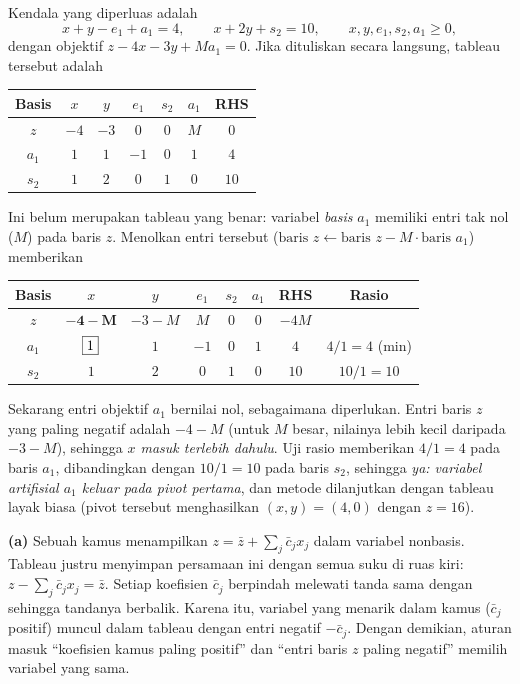 
Kendala yang diperluas adalah
\[
x + y - e_1 + a_1 = 4,
\qquad
x + 2y + s_2 = 10,
\qquad
x, y, e_1, s_2, a_1 \geq 0,
\]
dengan objektif $z - 4x - 3y + M a_1 = 0$. Jika dituliskan secara langsung,
tableau tersebut adalah
\begin{center}
\renewcommand{\arraystretch}{1.3}
\begin{tabular}{c|ccccc|c}
Basis & $x$ & $y$ & $e_1$ & $s_2$ & $a_1$ & RHS\\
\hline
$z$   & $-4$ & $-3$ & $0$ & $0$ & $M$ & $0$\\
\hline
$a_1$ & $1$ & $1$ & $-1$ & $0$ & $1$ & $4$\\
$s_2$ & $1$ & $2$ & $0$  & $1$ & $0$ & $10$\\
\end{tabular}
\end{center}
Ini belum merupakan tableau yang benar: variabel \emph{basis} $a_1$ memiliki
entri tak nol ($M$) pada baris $z$. Menolkan entri tersebut
($\text{baris }z \leftarrow \text{baris }z - M \cdot \text{baris }a_1$) memberikan
\begin{center}
\renewcommand{\arraystretch}{1.3}
\begin{tabular}{c|ccccc|c|c}
Basis & $x$ & $y$ & $e_1$ & $s_2$ & $a_1$ & RHS & Rasio\\
\hline
$z$   & $\mathbf{-4-M}$ & $-3-M$ & $M$ & $0$ & $0$ & $-4M$ & \\
\hline
$a_1$ & $\fbox{1}$ & $1$ & $-1$ & $0$ & $1$ & $4$ & $4/1 = 4$ (min) \\
$s_2$ & $1$ & $2$ & $0$  & $1$ & $0$ & $10$ & $10/1 = 10$\\
\end{tabular}
\end{center}
Sekarang entri objektif $a_1$ bernilai nol, sebagaimana diperlukan. Entri baris
$z$ yang paling negatif adalah $-4 - M$ (untuk $M$ besar, nilainya lebih kecil
daripada $-3 - M$), sehingga \emph{$x$ masuk terlebih dahulu}. Uji rasio
memberikan $4/1 = 4$ pada baris $a_1$, dibandingkan dengan $10/1 = 10$ pada
baris $s_2$, sehingga \emph{ya: variabel artifisial $a_1$ keluar pada pivot
pertama}, dan metode dilanjutkan dengan tableau layak biasa (pivot tersebut
menghasilkan $(x, y) = (4, 0)$ dengan $z = 16$).


\textbf{(a)} Sebuah kamus menampilkan
$z = \bar z + \sum_j \bar c_j x_j$ dalam variabel nonbasis. Tableau justru
menyimpan persamaan ini dengan semua suku di ruas kiri:
$z - \sum_j \bar c_j x_j = \bar z$. Setiap koefisien $\bar c_j$ berpindah
melewati tanda sama dengan sehingga tandanya berbalik. Karena itu, variabel yang
menarik dalam kamus ($\bar c_j$ positif) muncul dalam tableau dengan entri
negatif $-\bar c_j$. Dengan demikian, aturan masuk ``koefisien kamus paling
positif'' dan ``entri baris $z$ paling negatif'' memilih variabel yang sama.

